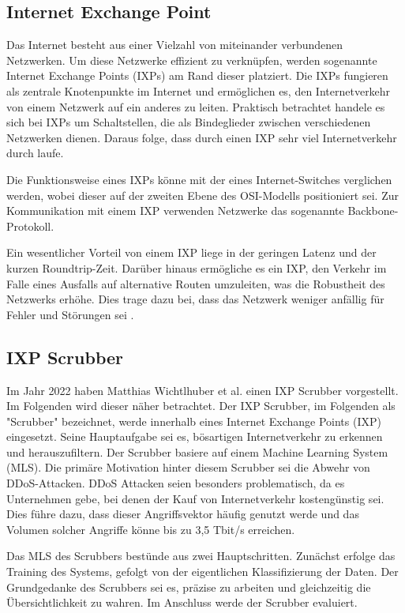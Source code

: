 \documentclass[sigplan,screen]{acmart}
\begin{document}
\subsection{Internet Exchange Point}
Das Internet besteht aus einer Vielzahl von miteinander verbundenen Netzwerken. Um diese Netzwerke effizient zu verknüpfen, werden sogenannte Internet Exchange Points (IXPs) am Rand dieser platziert. Die IXPs fungieren als zentrale Knotenpunkte im Internet und ermöglichen es, den Internetverkehr von einem Netzwerk auf ein anderes zu leiten. Praktisch betrachtet handele es sich bei IXPs um Schaltstellen, die als Bindeglieder zwischen verschiedenen Netzwerken dienen. Daraus folge, dass durch einen IXP sehr viel Internetverkehr durch laufe.

Die Funktionsweise eines IXPs könne mit der eines Internet-Switches verglichen werden, wobei dieser auf der zweiten Ebene des OSI-Modells positioniert sei. Zur Kommunikation mit einem IXP verwenden Netzwerke das sogenannte Backbone-Protokoll.

Ein wesentlicher Vorteil von einem IXP liege in der geringen Latenz und der kurzen Roundtrip-Zeit. Darüber hinaus ermögliche es ein IXP, den Verkehr im Falle eines Ausfalls auf alternative Routen umzuleiten, was die Robustheit des Netzwerks erhöhe. Dies trage dazu bei, dass das Netzwerk weniger anfällig für Fehler und Störungen sei \cite{ixp01}. 

\subsection{IXP Scrubber}
Im Jahr 2022 haben Matthias Wichtlhuber et al. \cite{Hohlfeld01} einen IXP Scrubber vorgestellt. Im Folgenden wird dieser näher betrachtet. Der IXP Scrubber, im Folgenden als "Scrubber" bezeichnet, werde innerhalb eines Internet Exchange Points (IXP) eingesetzt. Seine Hauptaufgabe sei es, bösartigen Internetverkehr zu erkennen und herauszufiltern. Der Scrubber basiere auf einem Machine Learning System (MLS). Die primäre Motivation hinter diesem Scrubber sei die Abwehr von DDoS-Attacken. DDoS Attacken seien besonders problematisch, da es Unternehmen gebe, bei denen der Kauf von Internetverkehr kostengünstig sei. Dies führe dazu, dass dieser Angriffsvektor häufig genutzt werde und das Volumen solcher Angriffe könne bis zu 3,5 Tbit/s erreichen.

Das MLS des Scrubbers bestünde aus zwei Hauptschritten. Zunächst erfolge das Training des Systems, gefolgt von der eigentlichen Klassifizierung der Daten. Der Grundgedanke des Scrubbers sei es, präzise zu arbeiten und gleichzeitig die Übersichtlichkeit zu wahren. Im Anschluss werde der Scrubber evaluiert.
\end{document}
